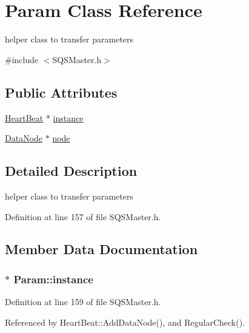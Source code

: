 \hypertarget{classParam}{\section{\-Param \-Class \-Reference}
\label{d7/d16/classParam}
}


helper class to transfer parameters  




{\ttfamily \#include $<$\-S\-Q\-S\-Master.\-h$>$}

\subsection*{\-Public \-Attributes}
\begin{DoxyCompactItemize}
\item 
\hyperlink{classHeartBeat}{\-Heart\-Beat} $\ast$ \hyperlink{classParam_a1e890d1b1a8bdc8882923d7e5db3e998}{instance}
\item 
\hyperlink{classDataNode}{\-Data\-Node} $\ast$ \hyperlink{classParam_a3e74d625d823037deea01bb8933ee62c}{node}
\end{DoxyCompactItemize}


\subsection{\-Detailed \-Description}
helper class to transfer parameters 

\-Definition at line 157 of file \-S\-Q\-S\-Master.\-h.



\subsection{\-Member \-Data \-Documentation}
\hypertarget{classParam_a1e890d1b1a8bdc8882923d7e5db3e998}{
\subsubsection[{instance}]{$\ast$ {\bf \-Param\-::instance}}}\label{d7/d16/classParam_a1e890d1b1a8bdc8882923d7e5db3e998}


\-Definition at line 159 of file \-S\-Q\-S\-Master.\-h.



\-Referenced by \-Heart\-Beat\-::\-Add\-Data\-Node(), and \-Regular\-Check().

